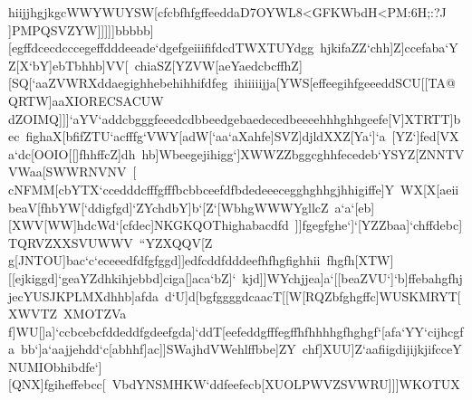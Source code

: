 {{{ hiijjhgjkgcWWYWUYSW[cfcbfhfgffeeddaD7OYWL8<GFKWbdH<PM:6H;:?J}
 \hbox{]PMPQSVZYW]]]]]bbbbb][egffdcecdcccegeffdddeeade`dgefgeiiififdcdTWXTUYdgg%
 hjkifaZZ`chh]Z]ccefaba`YZ[X`bY]ebTbhhb]VV[%
 chiaSZ[YZVW[aeYaedcbcffhZ][SQ[`aaZVWRXddaegighhebehihhifdfeg%
 ihiiiiijja[YWS[effeegihfgeeeddSCU[[TA@QRTW]aaXIORECSACUW}
 \hbox{dZOIMQ]]]`aYV`addcbgggfeeedcdbbeedgebaedecedbeeeehhhghhgeefe[V]XTRTT]bec%
 fighaX[bfifZTU`acfffg`VWY[adW[`aa`aXahfe]SVZ]djldXXZ[Ya`]`a%
 [YZ`]fed[VXa`dc[OOIO[[]fhhffcZ]dh%
 hb]Wbeegejihigg`]XWWZZbggcghhfecedeb`YSYZ[ZNNTVVWaa[SWWRNVNV%
 [}
 \hbox{cNFMM[cbYTX`ccedddcfffgfffbcbbceefdfbdedeeecegghghhgjhhigiffe]Y%
 WX[X[aeiibeaV[fhbYW[`ddigfgd]`ZYchdbY]b`[Z`[WbhgWWWYgllcZ%
 a`a`[eb][XWV[WW]hdcWd`[cfdec]NKGKQOThighabacdfd%
 ]]fgegfghe`]`[YZZbaa]`chffdebc]TQRVZXXSVUWWV%
 ``YZXQQV[Z}
 \hbox{g[JNTOU]bac`c`eceeedfdfgfggd]]edfcddfdddeefhfhgfighhii%
 fhgfh[XTW][[ejkiggd]`geaYZdhkihjebbd]ciga[]aca`bZ]`%
 kjd]]WYchjjea]a`[[beaZVU`]`b]ffebahgfhjjecYUSJKPLMXdhhb]afda%
 d`U]d[bgfggggdcaacT[[W[RQZbfghgffc]WUSKMRYT[XWVTZ%
 XMOTZVa}
 \hbox{f]WU[]a]`ccbcebcfddeddfgdeefgda]`ddT[eefeddgfffegffhfhhhhgfhghgf`[afa`YY`cijhcgfa%
 bb`]a`aajjehdd`c[abhhf]ac]]SWajhdVWehlffbbe]ZY%
 chf]XUU]Z`aafiigdijijkjifcceYNUMIObhibdfe`][QNX]fgiheffebcc[%
 VbdYNSMHKW`ddfeefecb[XUOLPWVZSVWRU]]]WKOTUX}
}}

